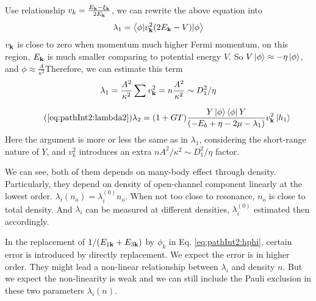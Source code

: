 Use relationship $v_{k}=\frac{E_{\mathbf{k}}-\xi_{\mathbf{k}}}{2E_{\mathbf{k}}}$, we can rewrite the above equation into 
\begin{equation*}
\lambda_{1}=\bigl<{\phi{\lvert{v_{\ensuremath{\mathbf{k}}}^{2}(2E_{\ensuremath{\mathbf{k}}}-V)}\rvert}\phi}\bigr>
\end{equation*}
$v_{\mathbf{k}}$ is close to zero when momentum much higher Fermi momentum, on this region, $E_{\mathbf{k}}$ is much smaller comparing to potential energy $V$.  So $V\left|\phi\right>\approx-\eta\left|\phi\right>$, and $\phi\approx\frac{A}{\kappa^{2}}$Therefore, we can estimate this term 
\begin{equation}
\lambda_{1}=\frac{A^{2}}{\kappa^{2}}\sum{}v_{\mathbf{k}}^{2}=n\frac{A^{2}}{\kappa^{2}}\sim{}D_{1}^{2}/\eta
\end{equation}







\begin{equation}\tag{\ref{eq:pathInt2:lambda2}}
\lambda_{2}=(1+GT)\frac{Y\ket{\phi}\bra{\phi}{Y}}{\br{-E_{b}+\eta-2\mu-\lambda_{1}}}v_{\vk}^{2}\ket{{h_{1}}}
\end{equation}
Here the argument is more or less the same as in $\lambda_{1}$, considering the short-range nature of $Y$, and $v_{k}^{2}$ introduces an extra $nA^{2}/\kappa^{2}\sim{}D_{1}^{2}/\eta$ factor.  

We can see, both of them depends on many-body effect through density.  Particularly, they depend on density of open-channel component linearly at the lowest order.  $\lambda_{i}(n_o)=\lambda_{i}^{(0)}n_o$.  When not too close to resonance, $n_o$ is close to total density.  And $\lambda_{i}$ can be measured at different densities,  $\lambda_{i}^{(0)}$ estimated then accordingly. 

In the replacement of $1/(E_{1\mathbf{k}}+E_{3\mathbf{k}})$ by $\phi_{k}$ in Eq. \ref{eq:pathInt2:hphi}, certain error is introduced by directly replacement.  We expect the error is in higher order.  They might lead a non-linear relationship between $\lambda_{i}$ and density $n$.  But we expect the non-linearity is weak and we can still include the Pauli exclusion in these two parameters $\lambda_{i}(n)$.



